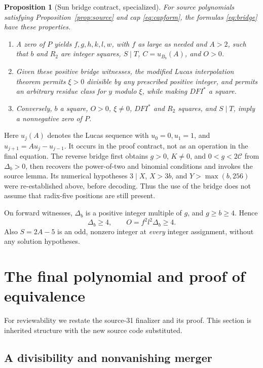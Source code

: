 \documentclass[11pt,letterpaper]{article}
\newcommand{\capc}{\mathscr C}
\newtheorem{proposition}[theorem]{Proposition}
\theoremstyle{remark}
\begin{document}
\begin{proposition}[Sun bridge contract, specialized]
\label{prop:bridge}
For source polynomials satisfying Proposition~\ref{prop:source} and
cap \eqref{eq:capform}, the formulas \eqref{eq:bridge} have these properties.
\begin{enumerate}
\item A zero of \(P\) yields \(f,g,h,k,l,w\), with \(f\) as large as
needed and \(A>2\), such that \(b\) and \(R_2\) are integer squares,
\(S\mid T\), \(C=u_{B_b}(A)\), and \(O>0\).
\item Given these positive bridge witnesses, the modified Lucas
interpolation theorem permits \(\xi>0\) divisible by any prescribed
positive integer, and permits an arbitrary residue class for \(y\)
modulo \(\xi\), while making \(DFI^*\) a square.
\item Conversely, \(b\) a square, \(O>0\), \(\xi\ne0\),
\(DFI^*\) and \(R_2\) squares, and \(S\mid T\), imply a nonnegative
zero of \(P\).
\end{enumerate}
\end{proposition}

Here \(u_j(A)\) denotes the Lucas sequence with \(u_0=0,u_1=1\), and
\(u_{j+1}=Au_j-u_{j-1}\). It occurs in the proof contract, not as an
operation in the final equation. The reverse bridge first obtains
\(g>0\), \(K\ne0\), and \(0<g<2\capc\) from \(\Delta_b>0\), then
recovers the power-of-two and binomial conditions and invokes the
source lemma. Its numerical hypotheses \(3\mid X\), \(X>3b\), and
\(Y>\max(b,256)\) were re-established above, before decoding.
Thus the use of the bridge does not assume that radix-five positions
are still present.

On forward witnesses, \(\Delta_b\) is a positive integer multiple of
\(g\), and \(g\ge b\ge4\). Hence
\[
\Delta_b\ge4,\qquad O=f^2l^2\Delta_b\ge4.
\]
Also \(S=2A-5\) is an odd, nonzero integer at \emph{every} integer
assignment, without any solution hypotheses.

\section{The final polynomial and proof of equivalence}
\label{sec:finalizer}

For reviewability we restate the source-31 finalizer and its proof.
This section is inherited structure with the new source code substituted.

\subsection{A divisibility and nonvanishing merger}
\end{document}
